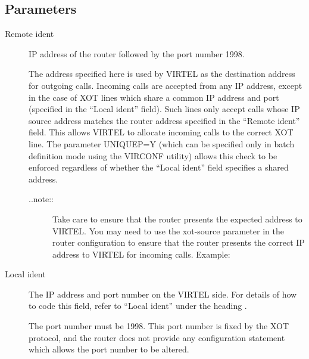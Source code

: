 \documentclass[letterpaper,10pt,english]{sphinxmanual}
\begin{document}
\subsection{Parameters}
\label{\detokenize{connectivity_guide:index-52}}\label{\detokenize{connectivity_guide:id22}}\begin{description}
\item[{Remote ident}] \leavevmode
IP address of the router followed by the port number 1998.

The address specified here is used by VIRTEL as the destination address for outgoing calls. Incoming calls are accepted from any IP address, except in the case of XOT lines which share a common IP address and port (specified in the “Local ident” field). Such lines only accept calls whose IP source address matches the router address specified in the “Remote ident” field. This allows VIRTEL to allocate incoming calls to the correct XOT line. The parameter UNIQUEP=Y (which can be specified only in batch definition mode
using the VIRCONF utility) allows this check to be enforced regardless of whether the “Local ident” field specifies a shared
address.
\begin{description}
\item[{..note::}] \leavevmode
Take care to ensure that the router presents the expected address to VIRTEL. You may need to use the xot-source parameter in the router configuration to ensure that the router presents the correct IP address to VIRTEL for incoming calls. Example:

\end{description}

\begin{sphinxVerbatim}[commandchars=\\\{\}]
      
\end{sphinxVerbatim}

\item[{Local ident}] \leavevmode
The IP address and port number on the VIRTEL side. For details of how to code this field, refer to “Local ident” under the heading {\hyperref[\detokenize{connectivity_guide:bookmark13}]{}}.

The port number must be 1998. This port number is fixed by the XOT protocol, and the router does not provide any configuration statement which allows the port number to be altered.


\end{description}
\end{document}
